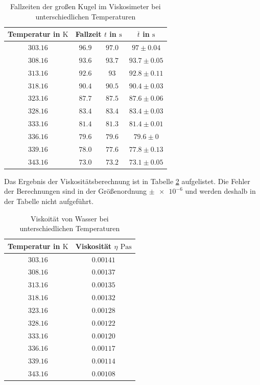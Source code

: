 \begin{table}
\centering
\begin{tabular} {cccc}
  \toprule
  Temperatur in $\si{\kelvin}$ & \multicolumn{2}{c}{Fallzeit $t$ in $\si{\second}$} & $\overline{t}$ in $\si{\second}$ \\
  \midrule 
  $\num{303.16}$ & $\num{96.9}$  & $\num{97.0}$ & $\num{97}\pm\num{0.04}$ \\
  $\num{308.16}$ & $\num{93.6}$  & $\num{93.7}$ & $\num{93.7}\pm\num{0.05}$ \\
  $\num{313.16}$ & $\num{92.6}$ & $\num{93}$   & $\num{92.8}\pm\num{0.11}$ \\
  $\num{318.16}$ & $\num{90.4}$ & $\num{90.5}$ &  $\num{90.4}\pm\num{0.03}$ \\
  $\num{323.16}$ & $\num{87.7}$ & $\num{87.5}$ & $\num{87.6}\pm\num{0.06}$ \\
  $\num{328.16}$ & $\num{83.4}$ & $\num{83.4}$ & $\num{83.4}\pm\num{0.03}$ \\
  $\num{333.16}$ & $\num{81.4}$ & $\num{81.3}$ & $\num{81.4}\pm\num{0.01}$ \\
  $\num{336.16}$ & $\num{79.6}$ & $\num{79.6}$ & $\num{79.6}\pm\num{0}$ \\
  $\num{339.16}$ & $\num{78.0}$ &  $\num{77.6}$ & $\num{77.8}\pm\num{0.13}$ \\
  $\num{343.16}$ & $\num{73.0}$ & $\num{73.2}$ & $\num{73.1}\pm\num{0.05}$ \\
\bottomrule
\end{tabular}
\caption{Fallzeiten der großen Kugel im Viskosimeter bei unterschiedlichen Temperaturen}
\label{tab:messwerte_fallzeit_kugel_gross_temo}
\end{table}

Das Ergebnis der Viskositätsberechnung ist in Tabelle \ref{tab:visko_wasser_temp} aufgelistet.
Die Fehler der Berechnungen sind in der Größenordnung $\pm \num{e-6}$ und 
werden deshalb in der Tabelle nicht aufgeführt.

\begin{table}
\centering
\begin{tabular} {cc}
  \toprule
  Temperatur in $\si{\kelvin}$ & Viskosität $\eta$ $\si{\pascal\second}$ \\
  \midrule 
  $\num{303.16}$ & $\num{0.00141}$ \\
  $\num{308.16}$ & $\num{0.00137}$ \\
  $\num{313.16}$ & $\num{0.00135}$ \\ 
  $\num{318.16}$ & $\num{0.00132}$ \\
  $\num{323.16}$ & $\num{0.00128}$ \\ 
  $\num{328.16}$ & $\num{0.00122}$ \\ 
  $\num{333.16}$ & $\num{0.00120}$ \\ 
  $\num{336.16}$ & $\num{0.00117}$ \\
  $\num{339.16}$ & $\num{0.00114}$ \\
  $\num{343.16}$ & $\num{0.00108}$ \\
\bottomrule
\end{tabular}
\caption{Viskoität von Wasser bei unterschiedlichen Temperaturen}
\label{tab:visko_wasser_temp}
\end{table}

